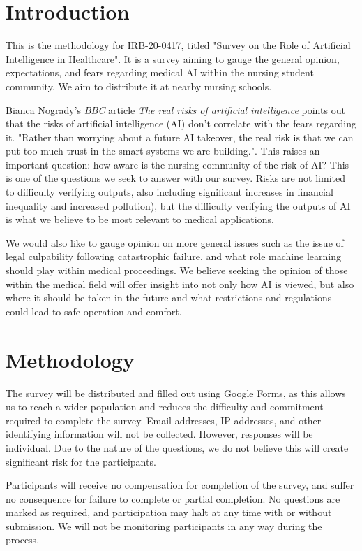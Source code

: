 \documentclass[]{article}
\begin{document}
	
    \section{Introduction}

    This is the methodology for IRB-20-0417, titled "Survey on the Role of Artificial Intelligence in Healthcare". It is a survey aiming to gauge the general opinion, expectations, and fears regarding medical AI within the nursing student community. We aim to distribute it at nearby nursing schools.

    Bianca Nogrady's \emph{BBC} article \emph{The real risks of artificial intelligence} points out that the risks of artificial intelligence (AI) don't correlate with the fears regarding it. "Rather than worrying about a future AI takeover, the real risk is that we can put too much trust in the smart systems we are building."\cite{bbc2016rroai}. This raises an important question: how aware is the nursing community of the risk of AI? This is one of the questions we seek to answer with our survey. Risks are not limited to difficulty verifying outputs, also including significant increases in financial inequality and increased pollution)\cite{emerj2019roawrtiwwa}, but the difficulty verifying the outputs of AI is what we believe to be most relevant to medical applications.

    We would also like to gauge opinion on more general issues such as the issue of legal culpability following catastrophic failure, and what role machine learning should play within medical proceedings. We believe seeking the opinion of those within the medical field will offer insight into not only how AI is viewed, but also where it should be taken in the future and what restrictions and regulations could lead to safe operation and comfort.
    
    \section{Methodology}

    The survey will be distributed and filled out using Google Forms, as this allows us to reach a wider population and reduces the difficulty and commitment required to complete the survey. Email addresses, IP addresses, and other identifying information will not be collected. However, responses will be individual. Due to the nature of the questions, we do not believe this will create significant risk for the participants.

    Participants will receive no compensation for completion of the survey, and suffer no consequence for failure to complete or partial completion. No questions are marked as required, and participation may halt at any time with or without submission. We will not be monitoring participants in any way during the process.
\end{document}

